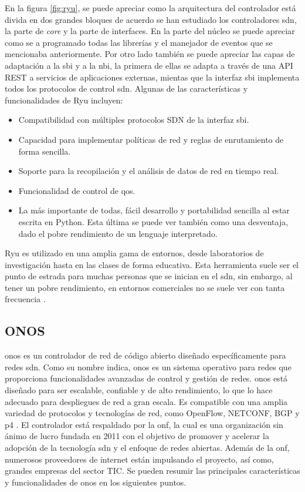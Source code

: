 En la figura \ref*{fig:ryu}, se puede apreciar como la arquitectura del controlador está divida en dos grandes bloques de acuerdo se han estudiado los controladores \gls{sdn}, la parte de \textit{core} y la parte de interfaces. En la parte del núcleo se puede apreciar como se a programado todas las librerías y el manejador de eventos que se mencionaba anteriormente. Por otro lado también se puede apreciar las capas de adaptación a la \gls{sbi} y a la \gls{nbi}, la primera de ellas se adapta a través de una API REST a servicios de aplicaciones externas, mientas que la interfaz \gls{sbi} implementa todos los protocolos de control \gls{sdn}. Algunas de las características y funcionalidades de Ryu incluyen:

\begin{itemize}
    \item Compatibilidad con múltiples protocolos SDN de la interfaz \gls{sbi}.
    \item Capacidad para implementar políticas de red y reglas de enrutamiento de forma sencilla.
    \item Soporte para la recopilación y el análisis de datos de red en tiempo real.
    \item Funcionalidad de control de \gls{qos}.
    \item La más importante de todas, fácil desarrollo y portabilidad sencilla al estar escrita en Python. Esta última se puede ver también como una desventaja, dado el pobre rendimiento de un lenguaje interpretado.
\end{itemize}

Ryu es utilizado en una amplia gama de entornos, desde laboratorios de investigación hasta en las clases de forma educativa. Esta herramienta suele ser el punto de estrada para muchas personas que se inician en el \gls{sdn}, sin embargo, al tener un pobre rendimiento, en entornos comerciales no se suele ver con tanta frecuencia \cite{tomonori2013introduction}.

\subsection{ONOS}
\label{subsec:ONOS}

\gls{onos} es un controlador de red de código abierto diseñado específicamente para redes \gls{sdn}. Como su nombre indica, \gls{onos} es un sistema operativo para redes que proporciona funcionalidades avanzadas de control y gestión de redes. \gls{onos} está diseñado para ser escalable, confiable y de alto rendimiento, lo que lo hace adecuado para despliegues de red a gran escala. Es compatible con una amplia variedad de protocolos y tecnologías de red, como OpenFlow, NETCONF, BGP y \gls{p4} \cite{onos3}. El controlador está respaldado por la \gls{onf}, la cual es una organización sin ánimo de lucro fundada en 2011 con el objetivo de promover y acelerar la adopción de la tecnología \gls{sdn} y el enfoque de redes abiertas. Además de la \gls{onf}, numerosos proveedores de internet están impulsando el proyecto, así como, grandes empresas del sector TIC. Se pueden resumir las principales características y funcionalidades de \gls{onos} en los siguientes puntos.


